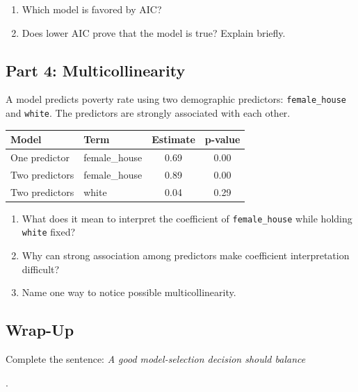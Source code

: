 \documentclass{article}
\newcommand{\blankline}[1]{\underline{\hspace{#1}}}
\begin{document}
\begin{enumerate}[label={\bfseries (\Alph*)},itemsep=.8em]
\item Which model is favored by AIC? \hfill \blankline{1.8in}
\item Does lower AIC prove that the model is true? Explain briefly. \\[3em]

\end{enumerate}

\subsection*{Part 4: Multicollinearity}
A model predicts poverty rate using two demographic predictors: \texttt{female\_house} and \texttt{white}. The predictors are strongly associated with each other.

\begin{center}
\renewcommand{\arraystretch}{1.35}
\begin{tabular}{llcc}
\toprule
\textbf{Model} & \textbf{Term} & \textbf{Estimate} & \textbf{p-value} \\
\midrule
One predictor & female\_house & 0.69 & 0.00 \\
Two predictors & female\_house & 0.89 & 0.00 \\
Two predictors & white & 0.04 & 0.29 \\
\bottomrule
\end{tabular}
\end{center}

\begin{enumerate}[label={\bfseries (\Alph*)},itemsep=.8em]
\item What does it mean to interpret the coefficient of \texttt{female\_house} while holding \texttt{white} fixed? \\[3.5em]
\item Why can strong association among predictors make coefficient interpretation difficult? \\[4em]
\item Name one way to notice possible multicollinearity. \hfill \blankline{2.2in}
\end{enumerate}

\subsection*{Wrap-Up}
Complete the sentence: \emph{A good model-selection decision should balance}

\noindent\blankline{6in}. \\[3em]
\end{document}
